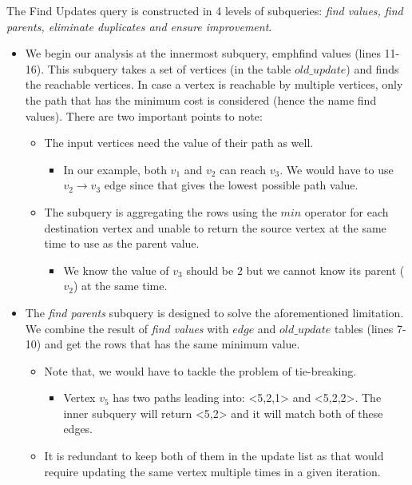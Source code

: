 The Find Updates query is constructed in 4 levels of subqueries: \emph{find
values, find parents, eliminate duplicates and ensure improvement}.

\begin{itemize}

\item We begin our analysis at the innermost subquery, emph{find values}
(lines 11-16). This subquery takes a set of vertices (in the table
$old\_update$) and finds the reachable vertices. In case a vertex is reachable
by multiple vertices, only the path that has the minimum cost is considered
(hence the name find values). There are two important points to note:
	\begin{itemize}
	\item The input vertices need the value of their path as well.
		\begin{itemize}
		\item In our example, both $v_1$ and $v_2$ can reach $v_3$. We would
		have to use $v_2 \rightarrow v_3$ edge since that gives the lowest possible
		path value.
		\end{itemize}
	\item The subquery is aggregating the rows using the $min$ operator for
	each destination vertex and  unable to return the source vertex at the
	same time to use as the parent value.
		\begin{itemize}
		\item We know the value of $v_3$ should be $2$ but we cannot know
		its parent ($v_2$) at the same time.
		\end{itemize}
	\end{itemize}

\item The \emph{find parents} subquery is designed to solve the
aforementioned limitation. We combine the result of \emph{find values} with
$edge$ and $old\_update$ tables (lines 7-10) and get the rows that has the
same minimum value.
	\begin{itemize}
	\item Note that, we would have to tackle the problem of tie-breaking.
		\begin{itemize}
		\item Vertex $v_5$ has two paths leading into: <5,2,1> and <5,2,2>.
		The inner subquery will return <5,2> and it will match both of these
		edges.
		\end{itemize}
	\item It is redundant to keep both of them in the update list as that
	would require updating the same vertex multiple times in a given
	iteration.
	\end{itemize}


\end{itemize}
